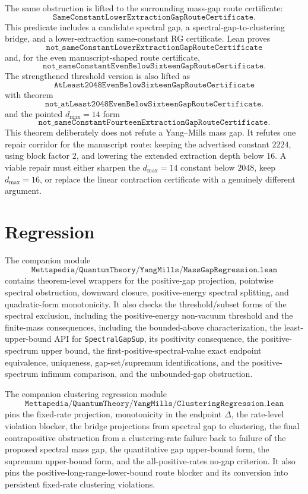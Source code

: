 \documentclass[11pt]{article}
\newcommand{\lean}[1]{\texttt{#1}}
\begin{document}
The same obstruction is lifted to the surrounding mass-gap route certificate:
\[
  \lean{SameConstantLowerExtractionGapRouteCertificate}.
\]
This predicate includes a candidate spectral gap, a spectral-gap-to-clustering
bridge, and a lower-extraction same-constant RG certificate.  Lean proves
\[
  \lean{not\_sameConstantLowerExtractionGapRouteCertificate}
\]
and, for the even manuscript-shaped route certificate,
\[
  \lean{not\_sameConstantEvenBelowSixteenGapRouteCertificate}.
\]
The strengthened threshold version is also lifted as
\[
  \lean{AtLeast2048EvenBelowSixteenGapRouteCertificate}
\]
with theorem
\[
  \lean{not\_atLeast2048EvenBelowSixteenGapRouteCertificate}.
\]
and the pointed \(d_{\max}=14\) form
\[
  \lean{not\_sameConstantFourteenExtractionGapRouteCertificate}.
\]
This theorem deliberately does not refute a Yang--Mills mass gap.  It refutes
one repair corridor for the manuscript route: keeping the advertised constant
\(2224\), using block factor \(2\), and lowering the extended extraction depth
below \(16\).  A viable repair must either sharpen the \(d_{\max}=14\)
constant below \(2048\), keep \(d_{\max}=16\), or replace the linear
contraction certificate with a genuinely different argument.

\section{Regression}

The companion module
\[
  \lean{Mettapedia/QuantumTheory/YangMills/MassGapRegression.lean}
\]
contains theorem-level wrappers for the positive-gap projection, pointwise
spectral obstruction, downward closure, positive-energy spectral splitting, and
quadratic-form monotonicity.  It also checks the threshold/subset forms of the
spectral exclusion, including the positive-energy non-vacuum threshold and the
finite-mass consequences, including the bounded-above characterization, the
least-upper-bound API for \lean{SpectralGapSup}, its positivity consequence,
the positive-spectrum upper bound, the first-positive-spectral-value exact
endpoint equivalence, uniqueness, gap-set/supremum identifications, and the
positive-spectrum infimum comparison, and the unbounded-gap obstruction.

The companion clustering regression module
\[
  \lean{Mettapedia/QuantumTheory/YangMills/ClusteringRegression.lean}
\]
pins the fixed-rate projection, monotonicity in the endpoint \(\Delta\), the
rate-level violation blocker, the bridge projections from spectral gap to
clustering, the final contrapositive obstruction from a clustering-rate
failure back to failure of the proposed spectral mass gap, the quantitative
gap upper-bound form, the supremum upper-bound form, and the all-positive-rates
no-gap criterion.  It also pins the positive-long-range-lower-bound route
blocker and its conversion into persistent fixed-rate clustering violations.
\end{document}
